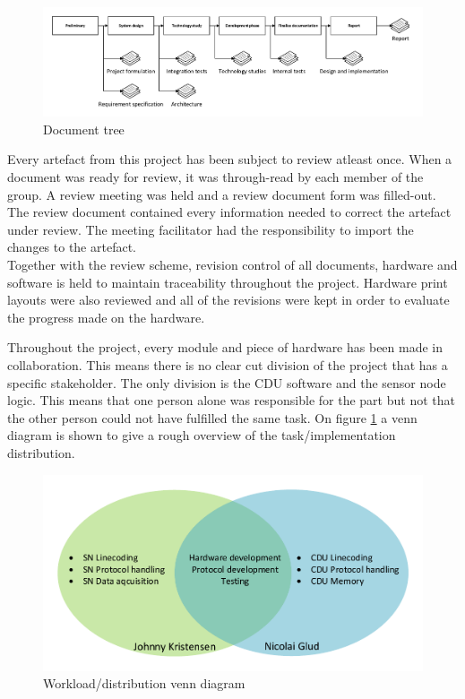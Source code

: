 \begin{figure}[hbpt]
	\centering
	\includegraphics[width=.95\textwidth]{billeder/9projectexecution/documenttree}
	\caption{Document tree}
\end{figure}

Every artefact from this project has been subject to review atleast once. When a document was ready for review, it was through-read by each member of the group. A review meeting was held and a review document form was filled-out. The review document contained every information needed to correct the artefact under review. The meeting facilitator had the responsibility to import the changes to the artefact.\\
Together with the review scheme, revision control of all documents, hardware and software is held to maintain traceability throughout the project. 
Hardware print layouts were also reviewed and all of the revisions were kept in order to evaluate the progress made on the hardware.

Throughout the project, every module and piece of hardware has been made in collaboration. This means there is no clear cut division of the project that has a specific stakeholder. The only division is the CDU software and the sensor node logic. This means that one person alone was responsible for the part but not that the other person could not have fulfilled the same task. On figure \ref{fig:workvenn} a venn diagram is shown to give a rough overview of the task/implementation distribution.

\begin{figure}[hbpt]
	\centering
	\includegraphics[width=.8\textwidth]{billeder/9projectexecution/workload_venn}
	\caption{Workload/distribution venn diagram}
	\label{fig:workvenn}
\end{figure}



